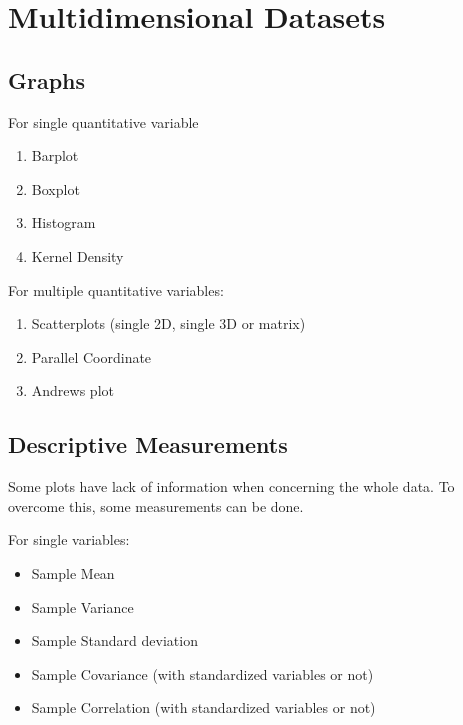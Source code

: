 \section{Multidimensional Datasets}

\subsection{Graphs}
For single quantitative variable
\begin{enumerate}
    \item Barplot
    \item Boxplot
    \item Histogram
    \item Kernel Density
\end{enumerate}

For multiple quantitative variables:
\begin{enumerate}
    \item Scatterplots (single 2D, single 3D or matrix)
    \item Parallel Coordinate
    \item Andrews plot
\end{enumerate}

\subsection{Descriptive Measurements}
Some plots have lack of information when concerning the whole data. To overcome
this, some measurements can be done.

For single variables:
\begin{itemize}
    \item Sample Mean 
    \item Sample Variance
    \item Sample Standard deviation 
    \item Sample Covariance (with standardized variables or not)
    \item Sample Correlation (with standardized variables or not)
\end{itemize}

